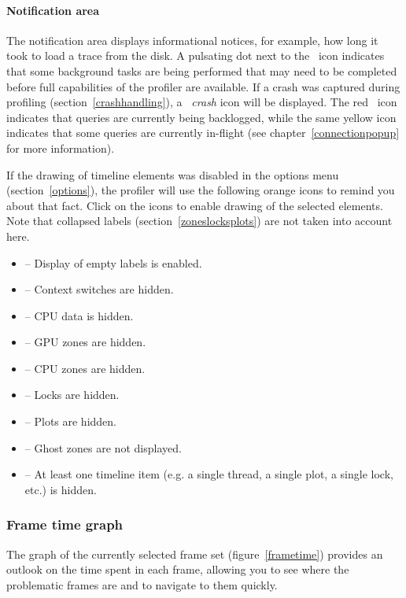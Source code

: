 \documentclass[hidelinks,titlepage,a4paper]{article}
\begin{document}
\paragraph{Notification area}

The notification area displays informational notices, for example, how long it took to load a trace from the disk. A pulsating dot next to the \faTasks~icon indicates that some background tasks are being performed that may need to be completed before full capabilities of the profiler are available. If a crash was captured during profiling (section~\ref{crashhandling}), a \emph{\faSkull{}~crash} icon will be displayed. The red \faSatelliteDish{}~icon indicates that queries are currently being backlogged, while the same yellow icon indicates that some queries are currently in-flight (see chapter~\ref{connectionpopup} for more information).

If the drawing of timeline elements was disabled in the options menu (section~\ref{options}), the profiler will use the following orange icons to remind you about that fact. Click on the icons to enable drawing of the selected elements. Note that collapsed labels (section~\ref{zoneslocksplots}) are not taken into account here.

\begin{itemize}
\item \faExpand{} -- Display of empty labels is enabled.
\item \faHiking{} -- Context switches are hidden.
\item \faSlidersH{} -- CPU data is hidden.
\item \faEye{} -- GPU zones are hidden.
\item \faMicrochip{} -- CPU zones are hidden.
\item \faLock{} -- Locks are hidden.
\item \faSignature{} -- Plots are hidden.
\item \faGhost{} -- Ghost zones are not displayed.
\item \faLowVision{} -- At least one timeline item (e.g. a single thread, a single plot, a single lock, etc.) is hidden.
\end{itemize}

\subsubsection{Frame time graph}
\label{frametimegraph}

The graph of the currently selected frame set (figure~\ref{frametime}) provides an outlook on the time spent in each frame, allowing you to see where the problematic frames are and to navigate to them quickly.
\end{document}
